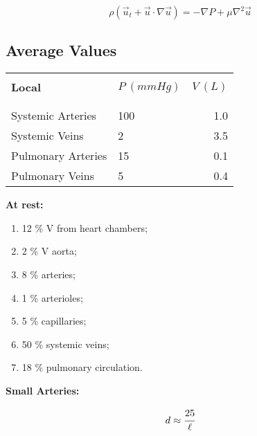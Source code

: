 \begin{equation}
    \rho (\vec{u}_t + \vec{u} \cdot \nabla \vec{u}) = - \nabla P + \mu \nabla^2 \vec{u}
\end{equation}


\newpage

\subsection{Average Values}


\begin{table}[h!] %
    \centering
    \begin{tabularx}{\linewidth}{X X R}
    \hline \\
    \textbf{Local} & $P \ (mmHg)$    & $V \ (L)$ \\ \\
    \hline 
                      &     &    \\[2pt] 
    Systemic Arteries & 100 & 1.0 \\[6pt]
    Systemic Veins & 2 & 3.5 \\[6pt]
    Pulmonary Arteries & 15 & 0.1 \\[6pt]
    Pulmonary Veins & 5 & 0.4 \\[12pt]
    \hline
    \end{tabularx}
\end{table}

\textbf{At rest:}

\begin{enumerate} %
    \item 12 \% V from heart chambers;
    \item 2 \% V aorta;
    \item 8 \% arteries;
    \item 1 \% arterioles;
    \item 5 \% capillaries;
    \item 50 \% systemic veins;
    \item 18 \% pulmonary circulation.
\end{enumerate}

\textbf{Small Arteries:}

\begin{equation}
    d \approx \cfrac{25}{\ell}
\end{equation}

